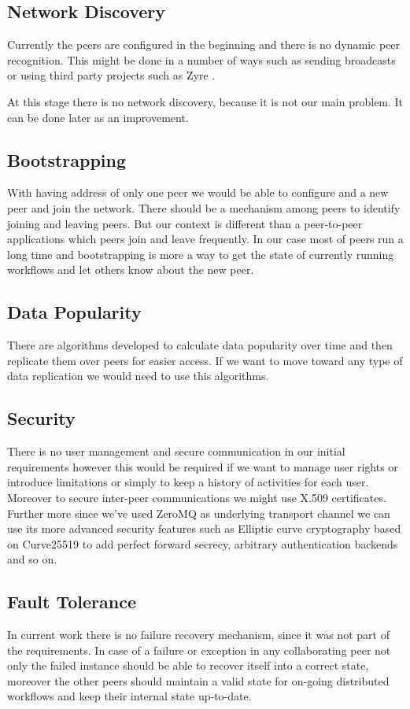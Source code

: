 \subsection{Network Discovery}
Currently the peers are configured in the beginning and there is no dynamic peer recognition. This might be done in a number of ways
such as sending broadcasts or using third party projects such as Zyre \cite{Zyre}.

At this stage there is no network discovery, because it is not our main problem. It can be done later as an improvement.

\subsection{Bootstrapping}
With having address of only one peer we would be able to configure and a new peer and join the network. There should be a mechanism among
peers to identify joining and leaving peers. But our context is different than a peer-to-peer applications which peers join and leave 
frequently. In our case most of peers run a long time and bootstrapping is more a way to get the state of currently running workflows and
let others know about the new peer.

\subsection{Data Popularity}
There are algorithms developed to calculate data popularity over time and then replicate them over peers for easier access. If we want to 
move toward any type of data replication we would need to use this algorithms.

\subsection{Security}
There is no user management and secure communication in our initial requirements however this would be required if we want to manage user
rights or introduce limitations or simply to keep a history of activities for each user. Moreover to secure inter-peer communications 
we might use X.509 certificates. Further more since we've used ZeroMQ\cite{ZeroMQ} as underlying transport channel we can use its more advanced
security features such as Elliptic curve cryptography\cite{Curve} based on Curve25519\cite{Curve25519} to add perfect forward secrecy, 
arbitrary authentication backends and so on.

\subsection{Fault Tolerance}
In current work there is no failure recovery mechanism, since it was not part of the requirements. In case of a failure or exception in any 
collaborating peer not only the failed instance should be able to recover itself into a correct state, moreover the other peers should maintain
a valid state for on-going distributed workflows and keep their internal state up-to-date.

